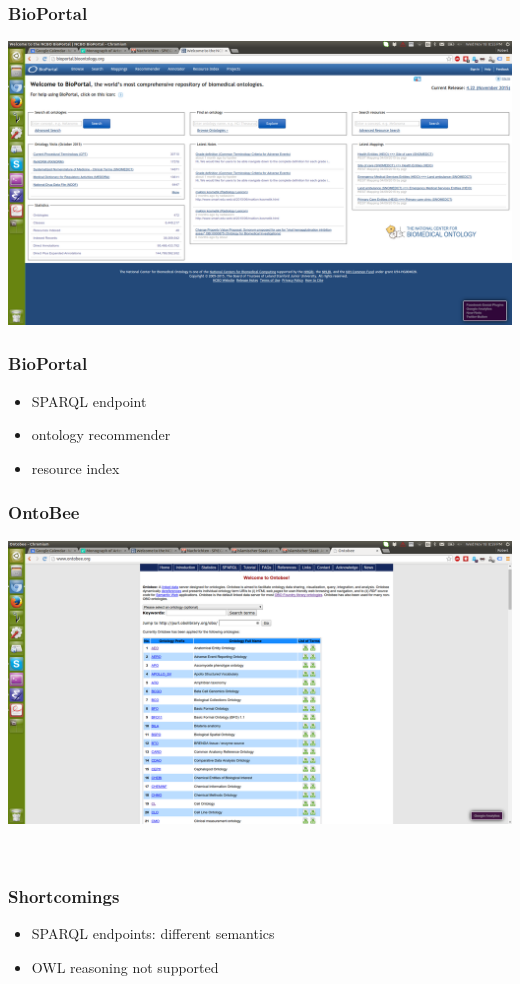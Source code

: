 \documentclass{beamer}
\begin{document}
\begin{frame}
  \frametitle{BioPortal}
  \centerline{\includegraphics[width=.9\textwidth]{bioportal-screen.png}}
\end{frame}

\begin{frame}
  \frametitle{BioPortal}
  \begin{itemize}
  \item SPARQL endpoint
  \item ontology recommender
  \item resource index
  \end{itemize}
\end{frame}

\begin{frame}
  \frametitle{OntoBee}
  \centerline{\includegraphics[width=.9\textwidth]{ontobee-screen.png}}\
\end{frame}

\begin{frame}
  \frametitle{Shortcomings}
  \begin{itemize}
  \item SPARQL endpoints: different semantics
  \item OWL reasoning not supported
  \end{itemize}
\end{frame}
\end{document}
